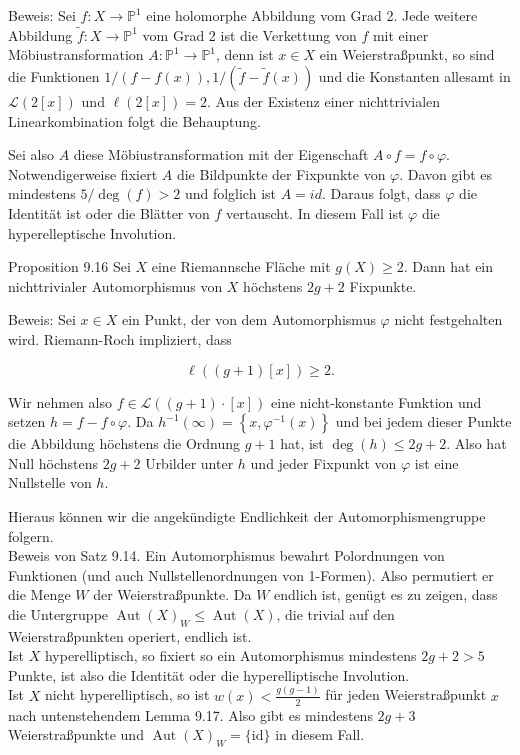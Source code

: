 \documentclass[10pt, letterpaper]{article}
\begin{document}
Beweis: Sei $f: X \longrightarrow \mathbb{P}^{1}$ eine holomorphe Abbildung vom Grad 2. Jede weitere Abbildung $\widetilde{f}: X \longrightarrow \mathbb{P}^{1}$ vom Grad 2 ist die Verkettung von $f$ mit einer Möbiustransformation $A: \mathbb{P}^{1} \longrightarrow \mathbb{P}^{1}$, denn ist $x \in X$ ein Weierstraßpunkt, so sind die Funktionen $1 /(f-f(x)), 1 /(\widetilde{f}-\widetilde{f}(x))$ und die Konstanten allesamt in $\mathcal{L}(2[x])$ und $\ell(2[x])=2$. Aus der Existenz einer nichttrivialen Linearkombination folgt die Behauptung.

Sei also $A$ diese Möbiustransformation mit der Eigenschaft $A \circ f=f \circ \varphi$. Notwendigerweise fixiert $A$ die Bildpunkte der Fixpunkte von $\varphi$. Davon gibt es mindestens $5 / \operatorname{deg}(f)>2$ und folglich ist $A=i d$. Daraus folgt, dass $\varphi$ die Identität ist oder die Blätter von $f$ vertauscht. In diesem Fall ist $\varphi$ die hyperelleptische Involution.

Proposition 9.16 Sei $X$ eine Riemannsche Fläche mit $g(X) \geqslant 2$. Dann hat ein nichttrivialer Automorphismus von $X$ höchstens $2 g+2$ Fixpunkte.

Beweis: Sei $x \in X$ ein Punkt, der von dem Automorphismus $\varphi$ nicht festgehalten wird. Riemann-Roch impliziert, dass

$$
\ell((g+1)[x]) \geqslant 2 .
$$

Wir nehmen also $f \in \mathcal{L}((g+1) \cdot[x])$ eine nicht-konstante Funktion und setzen $h=f-f \circ \varphi$. Da $h^{-1}(\infty)=\left\{x, \varphi^{-1}(x)\right\}$ und bei jedem dieser Punkte die Abbildung höchstens die Ordnung $g+1$ hat, ist $\operatorname{deg}(h) \leq 2 g+2$. Also hat Null höchstens $2 g+2$ Urbilder unter $h$ und jeder Fixpunkt von $\varphi$ ist eine Nullstelle von $h$.

Hieraus können wir die angekündigte Endlichkeit der Automorphismengruppe folgern.\\
Beweis von Satz 9.14. Ein Automorphismus bewahrt Polordnungen von Funktionen (und auch Nullstellenordnungen von 1-Formen). Also permutiert er die Menge $W$ der Weierstraßpunkte. Da $W$ endlich ist, genügt es zu zeigen, dass die Untergruppe $\operatorname{Aut}(X)_{W} \leq \operatorname{Aut}(X)$, die trivial auf den Weierstraßpunkten operiert, endlich ist.\\
Ist $X$ hyperelliptisch, so fixiert so ein Automorphismus mindestens $2 g+2>5$ Punkte, ist also die Identität oder die hyperelliptische Involution.\\
Ist $X$ nicht hyperelliptisch, so ist $w(x)<\frac{g(g-1)}{2}$ für jeden Weierstraßpunkt $x$ nach untenstehendem Lemma 9.17. Also gibt es mindestens $2 g+3$ Weierstraßpunkte und $\operatorname{Aut}(X)_{W}=\{\mathrm{id}\}$ in diesem Fall.
\end{document}
